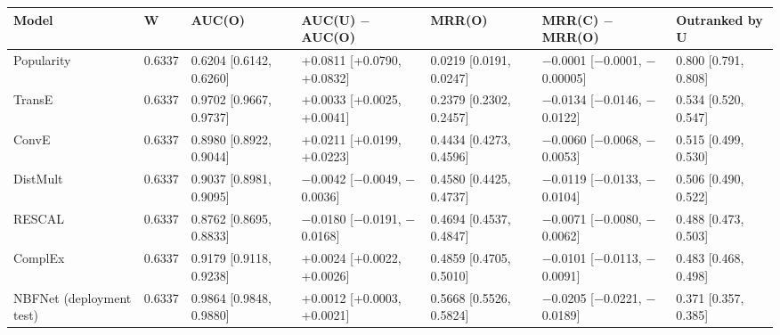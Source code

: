 \begin{tabular}{lllllll}
\toprule
Model & W & AUC(O) & AUC(U) $-$ AUC(O) & MRR(O) & MRR(C) $-$ MRR(O) & Outranked by U \\
\midrule
Popularity & 0.6337 & 0.6204 [0.6142, 0.6260] & +0.0811 [+0.0790, +0.0832] & 0.0219 [0.0191, 0.0247] & $-$0.0001 [$-$0.0001, $-$0.00005] & 0.800 [0.791, 0.808] \\
TransE & 0.6337 & 0.9702 [0.9667, 0.9737] & +0.0033 [+0.0025, +0.0041] & 0.2379 [0.2302, 0.2457] & $-$0.0134 [$-$0.0146, $-$0.0122] & 0.534 [0.520, 0.547] \\
ConvE & 0.6337 & 0.8980 [0.8922, 0.9044] & +0.0211 [+0.0199, +0.0223] & 0.4434 [0.4273, 0.4596] & $-$0.0060 [$-$0.0068, $-$0.0053] & 0.515 [0.499, 0.530] \\
DistMult & 0.6337 & 0.9037 [0.8981, 0.9095] & $-$0.0042 [$-$0.0049, $-$0.0036] & 0.4580 [0.4425, 0.4737] & $-$0.0119 [$-$0.0133, $-$0.0104] & 0.506 [0.490, 0.522] \\
RESCAL & 0.6337 & 0.8762 [0.8695, 0.8833] & $-$0.0180 [$-$0.0191, $-$0.0168] & 0.4694 [0.4537, 0.4847] & $-$0.0071 [$-$0.0080, $-$0.0062] & 0.488 [0.473, 0.503] \\
ComplEx & 0.6337 & 0.9179 [0.9118, 0.9238] & +0.0024 [+0.0022, +0.0026] & 0.4859 [0.4705, 0.5010] & $-$0.0101 [$-$0.0113, $-$0.0091] & 0.483 [0.468, 0.498] \\
NBFNet (deployment test) & 0.6337 & 0.9864 [0.9848, 0.9880] & +0.0012 [+0.0003, +0.0021] & 0.5668 [0.5526, 0.5824] & $-$0.0205 [$-$0.0221, $-$0.0189] & 0.371 [0.357, 0.385] \\
\bottomrule
\end{tabular}
